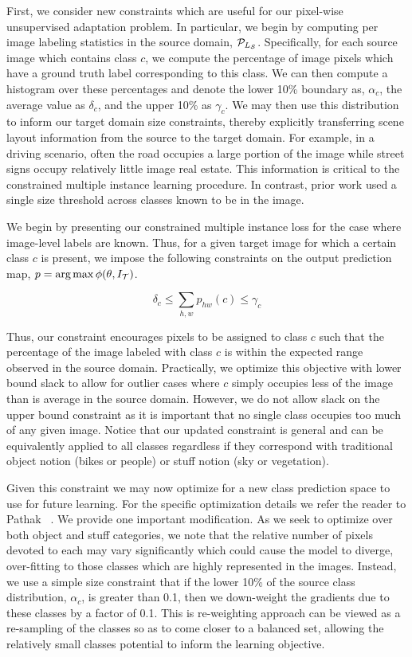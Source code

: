 \documentclass[10pt,twocolumn,letterpaper]{article}
\begin{document}
First, we consider new constraints which are useful for our pixel-wise unsupervised adaptation problem. In particular, we begin by computing per image labeling statistics in the source domain, $\mathcal{P}_{L_{\mathcal{S}}}$. Specifically, for each source image which contains class $c$, we compute the percentage of image pixels which have a ground truth label corresponding to this class. We can then compute a histogram over these percentages and denote the lower 10\% boundary as, $\alpha_c$, the average value as $\delta_c$, and the upper 10\% as $\gamma_c$. We may then use this distribution to inform our target domain size constraints, thereby explicitly transferring scene layout information from the source to the target domain. For example, in a driving scenario, often the road occupies a large portion of the image while street signs occupy relatively little image real estate. This information is critical to the constrained multiple instance learning procedure. In contrast, prior work used a single size threshold across classes known to be in the image.

We begin by presenting our constrained multiple instance loss for the case where image-level labels are known. Thus, for a given target image for which a certain class $c$ is present, we impose the following constraints on the output prediction map, $p = \text{arg}\max \phi(\theta, {I}_{\mathcal{T}})$.

\begin{equation}
	\delta_c \le \sum_{h,w} p_{hw}(c) \le \gamma_c
\end{equation}

Thus, our constraint encourages pixels to be assigned to class $c$ such that the percentage of the image labeled with class $c$ is within the expected range observed in the source domain.
Practically, we optimize this objective with lower bound slack to allow for outlier cases where $c$ simply occupies less of the image than is average in the source domain. However, we do not allow slack on the upper bound constraint as it is important that no single class occupies too much of any given image.
Notice that our updated constraint is general and can be equivalently applied to all classes regardless if they correspond with traditional object notion (\eg bikes or people) or stuff notion (\eg sky or vegetation). 

Given this constraint we may now optimize for a new class prediction space to use for future learning. For the specific optimization details we refer the reader to Pathak \etal~\cite{pathak2015constrained}. We provide one important modification. As we seek to optimize over both object and stuff categories, we note that the relative number of pixels devoted to each may vary significantly which could cause the model to diverge, over-fitting to those classes which are highly represented in the images. Instead, we use a simple size constraint that if the lower 10\% of the source class distribution, $\alpha_c$, is greater than 0.1, then we down-weight the gradients due to these classes by a factor of 0.1. This is re-weighting approach can be viewed as a re-sampling of the classes so as to come closer to a balanced set, allowing the relatively small classes potential to inform the learning objective.
\end{document}
